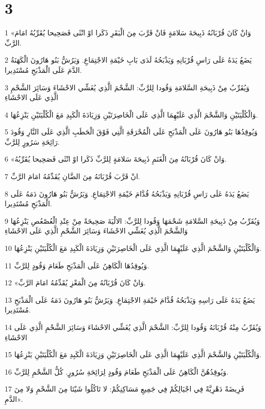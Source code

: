 \chapter{3}

\par 1 «وَانْ كَانَ قُرْبَانُهُ ذَبِيحَةَ سَلامَةٍ فَانْ قَرَّبَ مِنَ الْبَقَرِ ذَكَرا اوْ انْثَى فَصَحِيحا يُقَرِّبُهُ امَامَ الرَّبِّ.
\par 2 يَضَعُ يَدَهُ عَلَى رَاسِ قُرْبَانِهِ وَيَذْبَحُهُ لَدَى بَابِ خَيْمَةِ الاجْتِمَاعِ. وَيَرُشُّ بَنُو هَارُونَ الْكَهَنَةُ الدَّمَ عَلَى الْمَذْبَحِ مُسْتَدِيرا.
\par 3 وَيُقَرِّبُ مِنْ ذَبِيحَةِ السَّلامَةِ وَقُودا لِلرَّبِّ: الشَّحْمَ الَّذِي يُغَشِّي الاحْشَاءَ وَسَائِرَ الشَّحْمِ الَّذِي عَلَى الاحْشَاءِ
\par 4 وَالْكُلْيَتَيْنِ وَالشَّحْمَ الَّذِي عَلَيْهِمَا الَّذِي عَلَى الْخَاصِرَتَيْنِ وَزِيَادَةَ الْكَبِدِ مَعَ الْكُلْيَتَيْنِ يَنْزِعُهَا.
\par 5 وَيُوقِدُهَا بَنُو هَارُونَ عَلَى الْمَذْبَحِ عَلَى الْمُحْرَقَةِ الَّتِي فَوْقَ الْحَطَبِ الَّذِي عَلَى النَّارِ وَقُودَ رَائِحَةِ سَرُورٍ لِلرَّبِّ.
\par 6 «وَانْ كَانَ قُرْبَانُهُ مِنَ الْغَنَمِ ذَبِيحَةَ سَلامَةٍ لِلرَّبِّ ذَكَرا اوْ انْثَى فَصَحِيحا يُقَرِّبُهُ.
\par 7 انْ قَرَّبَ قُرْبَانَهُ مِنَ الضَّانِ يُقَدِّمُهُ امَامَ الرَّبِّ.
\par 8 يَضَعُ يَدَهُ عَلَى رَاسِ قُرْبَانِهِ وَيَذْبَحُهُ قُدَّامَ خَيْمَةِ الاجْتِمَاعِ. وَيَرُشُّ بَنُو هَارُونَ دَمَهُ عَلَى الْمَذْبَحِ مُسْتَدِيرا.
\par 9 وَيُقَرِّبُ مِنْ ذَبِيحَةِ السَّلامَةِ شَحْمَهَا وَقُودا لِلرَّبِّ: الالْيَةَ صَحِيحَةً مِنْ عِنْدِ الْعُصْعُصِ يَنْزِعُهَا وَالشَّحْمَ الَّذِي يُغَشِّي الاحْشَاءَ وَسَائِرَ الشَّحْمِ الَّذِي عَلَى الاحْشَاءِ
\par 10 وَالْكُلْيَتَيْنِ وَالشَّحْمَ الَّذِي عَلَيْهِمَا الَّذِي عَلَى الْخَاصِرَتَيْنِ وَزِيَادَةَ الْكَبِدِ مَعَ الْكُلْيَتَيْنِ يَنْزِعُهَا.
\par 11 وَيُوقِدُهَا الْكَاهِنُ عَلَى الْمَذْبَحِ طَعَامَ وَقُودٍ لِلرَّبِّ.
\par 12 «وَانْ كَانَ قُرْبَانُهُ مِنَ الْمَعْزِ يُقَدِّمُهُ امَامَ الرَّبِّ.
\par 13 يَضَعُ يَدَهُ عَلَى رَاسِهِ وَيَذْبَحُهُ قُدَّامَ خَيْمَةِ الاجْتِمَاعِ. وَيَرُشُّ بَنُو هَارُونَ دَمَهُ عَلَى الْمَذْبَحِ مُسْتَدِيرا.
\par 14 وَيُقَرِّبُ مِنْهُ قُرْبَانَهُ وَقُودا لِلرَّبِّ: الشَّحْمَ الَّذِي يُغَشِّي الاحْشَاءَ وَسَائِرَ الشَّحْمِ الَّذِي عَلَى الاحْشَاءِ
\par 15 وَالْكُلْيَتَيْنِ وَالشَّحْمَ الَّذِي عَلَيْهِمَا الَّذِي عَلَى الْخَاصِرَتَيْنِ وَزِيَادَةَ الْكَبِدِ مَعَ الْكُلْيَتَيْنِ يَنْزِعُهَا.
\par 16 وَيُوقِدُهُنَّ الْكَاهِنُ عَلَى الْمَذْبَحِ طَعَامَ وَقُودٍ لِرَائِحَةِ سُرُورٍ. كُلُّ الشَّحْمِ لِلرَّبِّ.
\par 17 فَرِيضَةً دَهْرِيَّةً فِي اجْيَالِكُمْ فِي جَمِيعِ مَسَاكِنِكُمْ: لا تَاكُلُوا شَيْئا مِنَ الشَّحْمِ وَلا مِنَ الدَّمِ».

